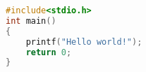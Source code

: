 \documentclass{article}
\begin{document}
\begin{lstlisting}[language=C]
#include<stdio.h>
int main()
{
	printf("Hello world!");
	return 0;
}
\end{lstlisting}
\end{document}
